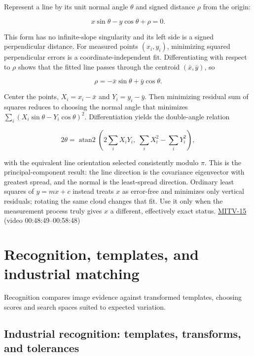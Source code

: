 Represent a line by its unit normal angle \(\theta\) and signed distance \(\rho\) from the origin:

\[
x\sin\theta-y\cos\theta+\rho=0.
\]

This form has no infinite-slope singularity and its left side is a signed perpendicular distance. For measured points \((x_i,y_i)\), minimizing squared perpendicular errors is a coordinate-independent fit. Differentiating with respect to \(\rho\) shows that the fitted line passes through the centroid \((\bar x,\bar y)\), so

\[
\rho=-\bar x\sin\theta+\bar y\cos\theta.
\]

Center the points, \(X_i=x_i-\bar x\) and \(Y_i=y_i-\bar y\). Then minimizing residual sum of squares reduces to choosing the normal angle that minimizes \(\sum_i(X_i\sin\theta-Y_i\cos\theta)^2\). Differentiation yields the double-angle relation

\[
2\theta=\operatorname{atan2}\left(2\sum_iX_iY_i,\;\sum_iX_i^2-\sum_iY_i^2\right),
\]

with the equivalent line orientation selected consistently modulo \(\pi\). This is the principal-component result: the line direction is the covariance eigenvector with greatest spread, and the normal is the least-spread direction. Ordinary least squares of \(y=mx+c\) instead treats \(x\) as error-free and minimizes only vertical residuals; rotating the same cloud changes that fit. Use it only when the measurement process truly gives \(x\) a different, effectively exact status. \hyperref[04-visual-computing-ii-ch036-mitv-15---alignment-patmax-distance-field-filtering-and-sub-sampling-us-7065262]{MITV-15} (video 00:48:49--00:58:48)

\section{Recognition, templates, and industrial matching}\label{04-visual-computing-ii-ch030-recognition-templates-and-industrial-matching}

Recognition compares image evidence against transformed templates, choosing scores and search spaces suited to expected variation.

\subsection{Industrial recognition: templates, transforms, and tolerances}\label{04-visual-computing-ii-ch030-industrial-recognition-templates-transforms-and-tolerances}

